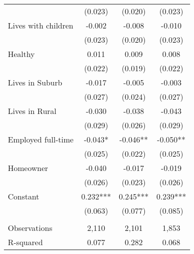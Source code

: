 \begin{tabular}{lccc}
 & (0.023) & (0.020) & (0.023) \\
Lives with children & -0.002 & -0.008 & -0.010 \\
 & (0.023) & (0.020) & (0.023) \\
Healthy & 0.011 & 0.009 & 0.008 \\
 & (0.022) & (0.019) & (0.022) \\
Lives in Suburb & -0.017 & -0.005 & -0.003 \\
 & (0.027) & (0.024) & (0.027) \\
Lives in Rural & -0.030 & -0.038 & -0.043 \\
 & (0.029) & (0.026) & (0.029) \\
Employed full-time & -0.043* & -0.046** & -0.050** \\
 & (0.025) & (0.022) & (0.025) \\
Homeowner & -0.040 & -0.017 & -0.019 \\
 & (0.026) & (0.023) & (0.026) \\
Constant & 0.232*** & 0.245*** & 0.239*** \\
 & (0.063) & (0.077) & (0.085) \\
 &  &  &  \\
Observations & 2,110 & 2,101 & 1,853 \\
 R-squared & 0.077 & 0.282 & 0.068 \\ \hline
\end{tabular}
